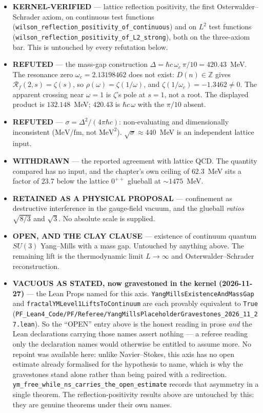 \begin{itemize}
\item \textbf{KERNEL-VERIFIED} --- lattice reflection positivity, the first
  Osterwalder--Schrader axiom, on continuous test functions
  (\texttt{wilson\_reflection\_positivity\_of\_continuous}) and on $L^2$ test
  functions (\texttt{wilson\_reflection\_positivity\_of\_L2\_strong}), both on
  the three-axiom bar. This is untouched by every refutation below.
\item \textbf{REFUTED} --- the mass-gap construction
  $\Delta = \hbar c\,\omega_c\,\pi/10 = 420.43$~MeV. The resonance zero
  $\omega_c = 2.13198462$ does not exist: $D(n)\in\mathbb{Z}$ gives
  $\mathcal{R}_f(2,s) = \zeta(s)$, so $\rho(\omega) = \zeta(1/\omega)$, and
  $\zeta(1/\omega_c) = -1.3462 \neq 0$. The apparent crossing near $\omega = 1$
  is $\zeta$'s pole at $s = 1$, not a root. The displayed product is
  $132.148$~MeV; $420.43$ is $\hbar c\,\omega$ with the $\pi/10$ absent.
\item \textbf{REFUTED} --- $\sigma = \Delta^2/(4\pi\hbar c)$: non-evaluating and
  dimensionally inconsistent ($\mathrm{MeV}/\mathrm{fm}$, not
  $\mathrm{MeV}^2$). $\sqrt{\sigma}\approx 440$~MeV is an independent lattice
  input.
\item \textbf{WITHDRAWN} --- the reported agreement with lattice QCD. The
  quantity compared has no input, and the chapter's own ceiling of $62.3$~MeV
  sits a factor of $23.7$ below the lattice $0^{++}$ glueball at
  ${\sim}1475$~MeV.
\item \textbf{RETAINED AS A PHYSICAL PROPOSAL} --- confinement as destructive
  interference in the gauge-field vacuum, and the glueball \emph{ratios}
  $\sqrt{8/3}$ and $\sqrt{3}$. No absolute scale is supplied.
\item \textbf{OPEN, AND THE CLAY CLAUSE} --- existence of continuum quantum
  $SU(3)$ Yang--Mills with a mass gap. Untouched by anything above. The
  remaining lift is the thermodynamic limit $L\to\infty$ and
  Osterwalder--Schrader reconstruction.
\item \textbf{VACUOUS AS STATED, now gravestoned in the kernel
  (2026-11-27)} --- the Lean Props named for this axis.
  \texttt{YangMillsExistenceAndMassGap} and
  \texttt{fractalYMLevel1LiftsToContinuum} are each provably equivalent to
  \texttt{True}
  (\texttt{PF\_Lean4\_Code/PF/Referee/YangMillsPlaceholderGravestones\_2026\_11\_27.lean}).
  So the ``OPEN'' entry above is the honest reading in prose \emph{and} the
  Lean declarations carrying those names assert nothing --- a referee reading
  only the declaration names would otherwise be entitled to assume more. No
  repoint was available here: unlike Navier--Stokes, this axis has no open
  estimate already formalised for the hypothesis to name, which is why the
  gravestones stand alone rather than being paired with a redirection.
  \texttt{ym\_free\_while\_ns\_carries\_the\_open\_estimate} records that
  asymmetry in a single theorem. The reflection-positivity results above are
  untouched by this: they are genuine theorems under their own names.

\end{itemize}

